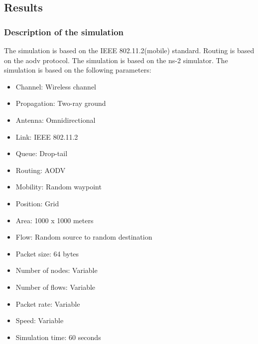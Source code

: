 \subsection{Results}
\subsubsection{Description of the simulation}
The simulation is based on the IEEE 802.11.2(mobile) standard. Routing is based on the aodv protocol. The simulation is based on the ns-2 simulator. The simulation is based on the following parameters:
\begin{itemize}
    \item Channel: Wireless channel
    \item Propagation: Two-ray ground
    \item Antenna: Omnidirectional
    \item Link: IEEE 802.11.2
    \item Queue: Drop-tail
    \item Routing: AODV
    \item Mobility: Random waypoint
    \item Position: Grid
    \item Area: 1000 x 1000 meters
    \item Flow: Random source to random destination
    \item Packet size: 64 bytes
    \item Number of nodes: Variable
    \item Number of flows: Variable
    \item Packet rate: Variable
    \item Speed: Variable
    \item Simulation time: 60 seconds
\end{itemize}

